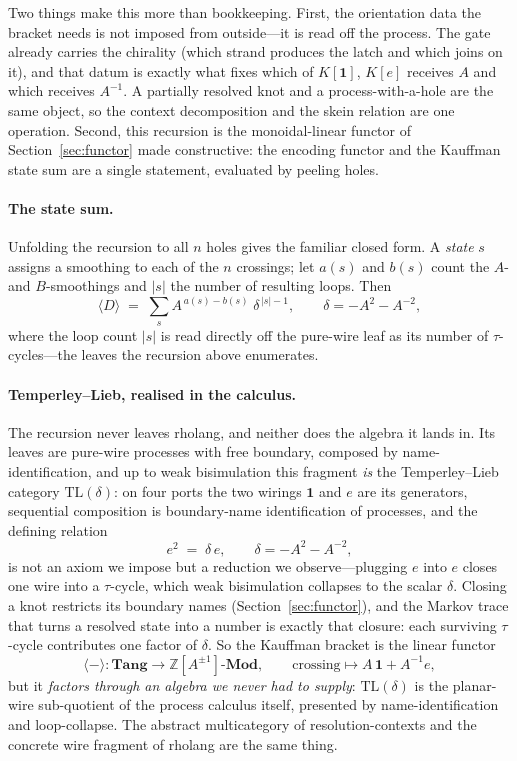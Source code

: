 \documentclass[11pt]{article}
\theoremstyle{definition}
\begin{document}
Two things make this more than bookkeeping. First, the orientation data the bracket
needs is not imposed from outside---it is read off the process. The gate already
carries the chirality (which strand produces the latch and which joins on it), and
that datum is exactly what fixes which of $K[\mathbf{1}]$, $K[e]$ receives $A$ and
which receives $A^{-1}$. A partially resolved knot and a process-with-a-hole are the
same object, so the context decomposition and the skein relation are one operation.
Second, this recursion is the monoidal-linear functor of
Section~\ref{sec:functor} made constructive: the encoding functor and the Kauffman
state sum are a single statement, evaluated by peeling holes.

\paragraph{The state sum.}
Unfolding the recursion to all $n$ holes gives the familiar closed form. A
\emph{state} $s$ assigns a smoothing to each of the $n$ crossings; let $a(s)$ and
$b(s)$ count the $A$- and $B$-smoothings and $|s|$ the number of resulting loops.
Then
\[
\langle D\rangle \;=\; \sum_{s} A^{\,a(s)-b(s)}\;\delta^{\,|s|-1},
\qquad \delta=-A^2-A^{-2},
\]
where the loop count $|s|$ is read directly off the pure-wire leaf as its number
of $\tau$-cycles---the leaves the recursion above enumerates.

\paragraph{Temperley--Lieb, realised in the calculus.}
The recursion never leaves rholang, and neither does the algebra it lands in. Its
leaves are pure-wire processes with free boundary, composed by name-identification,
and up to weak bisimulation this fragment \emph{is} the Temperley--Lieb category
$\mathrm{TL}(\delta)$: on four ports the two wirings $\mathbf{1}$ and $e$ are its
generators, sequential composition is boundary-name identification of processes, and
the defining relation
\[
e^{2} \;=\; \delta\, e, \qquad \delta = -A^{2}-A^{-2},
\]
is not an axiom we impose but a reduction we observe---plugging $e$ into $e$ closes
one wire into a $\tau$-cycle, which weak bisimulation collapses to the scalar
$\delta$. Closing a knot restricts its boundary names (Section~\ref{sec:functor}),
and the Markov trace that turns a resolved state into a number is exactly that
closure: each surviving $\tau$-cycle contributes one factor of $\delta$. So the
Kauffman bracket is the linear functor
\[
\langle-\rangle\colon \mathbf{Tang}\longrightarrow \mathbb{Z}[A^{\pm1}]\text{-}\mathbf{Mod},
\qquad \text{crossing}\mapsto A\,\mathbf{1}+A^{-1}e,
\]
but it \emph{factors through an algebra we never had to supply}: $\mathrm{TL}(\delta)$
is the planar-wire sub-quotient of the process calculus itself, presented by
name-identification and loop-collapse. The abstract multicategory of
resolution-contexts and the concrete wire fragment of rholang are the same thing.
\end{document}
